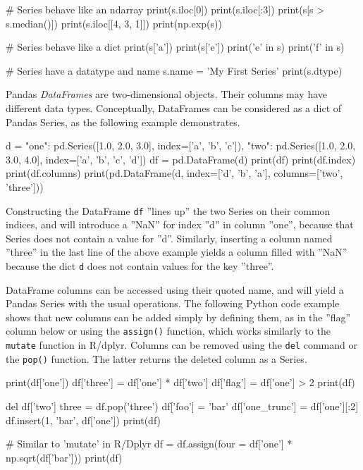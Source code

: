 \begin{samepage}
\begin{pythoncode}
# Series behave like an ndarray
print(s.iloc[0])
print(s.iloc[:3])
print(s[s > s.median()])
print(s.iloc[[4, 3, 1]])
print(np.exp(s))

# Series behave like a dict
print(s['a'])
print(s['e'])
print('e' in s)
print('f' in s)

# Series have a datatype and name
s.name = 'My First Series'
print(s.dtype)
\end{pythoncode}
\end{samepage}

Pandas \emph{DataFrames} are two-dimensional objects. Their columns may have different data types. Conceptually, DataFrames can be considered as a dict of Pandas Series, as the following example demonstrates. 

\begin{samepage}
\begin{pythoncode}
d = {
    "one": pd.Series([1.0, 2.0, 3.0], 
                index=['a', 'b', 'c']),
    "two": pd.Series([1.0, 2.0, 3.0, 4.0], 
                index=['a', 'b', 'c', 'd'])
}
df = pd.DataFrame(d)
print(df)
print(df.index)
print(df.columns)
print(pd.DataFrame(d, index=['d', 'b', 'a'], 
                      columns=['two', 'three']))
\end{pythoncode}
\end{samepage}

Constructing the DataFrame \texttt{df} ''lines up'' the two Series on their common indices, and will introduce a ''NaN'' for index ''d'' in column ''one'', because that Series does not contain a value for ''d''. Similarly, inserting a column named ''three'' in the last line of the above example yields a column filled with ''NaN'' because the dict \texttt{d} does not contain values for the key ''three''.

DataFrame columns can be accessed using their quoted name, and will yield a Pandas Series with the usual operations. The following Python code example shows that new columns can be added simply by defining them, as in the ''flag'' column below or using the \texttt{assign()} function, which works similarly to the \texttt{mutate} function in R/dplyr. Columns can be removed using the \texttt{del} command or the \texttt{pop()} function. The latter returns the deleted column as a Series.

\begin{samepage}
\begin{pythoncode}
print(df['one'])
df['three'] = df['one'] * df['two']
df['flag'] = df['one'] > 2
print(df)

del df['two']
three = df.pop('three')
df['foo'] = 'bar'
df['one_trunc'] = df['one'][:2]
df.insert(1, 'bar', df['one'])
print(df)

# Similar to 'mutate' in R/Dplyr 
df = df.assign(four = df['one'] * np.sqrt(df['bar']))
print(df)
\end{pythoncode}
\end{samepage}

